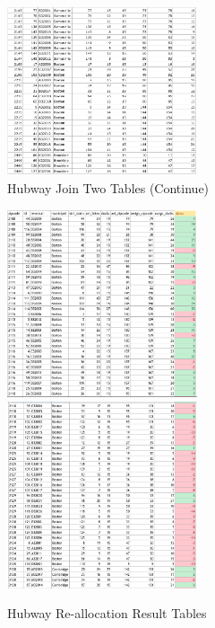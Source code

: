 \documentclass[journal, letterpaper]{IEEEtran}
\begin{document}

\begin{figure}
  \includegraphics[width=0.5\textwidth]{jo4.png}
  \caption{Hubway Join Two Tables (Continue)}
  \label{fig:3}
\end{figure}

\begin{figure}
  \includegraphics[width=0.5\textwidth]{reall1.png}
  \includegraphics[width=0.5\textwidth]{reall2.png}
  \caption{Hubway Re-allocation Result Tables}
  \label{fig:4}
\end{figure}
\end{document}
